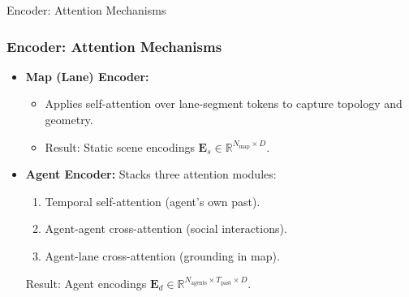 \documentclass[10pt,aspectratio=169]{beamer}
\begin{document}
\begin{frame}{Encoder: Attention Mechanisms}
    \frametitle{Encoder: Attention Mechanisms}
    \begin{itemize}
        \item<1-> \textbf{Map (Lane) Encoder:}
              \begin{itemize}
                \item Applies self-attention over lane-segment tokens to capture topology and geometry.
                \item Result: Static scene encodings \(\mathbf{E}_s \in \mathbb{R}^{N_{\text{map}} \times D}\).
              \end{itemize}
        \item<2-> \textbf{Agent Encoder:} Stacks three attention modules:
              \begin{enumerate}
                \item Temporal self-attention (agent's own past).
                \item Agent-agent cross-attention (social interactions).
                \item Agent-lane cross-attention (grounding in map).
              \end{enumerate}
              Result: Agent encodings \(\mathbf{E}_d \in \mathbb{R}^{N_{\text{agents}} \times T_{\text{past}} \times D}\).
    \end{itemize}
\end{frame}
\end{document}
